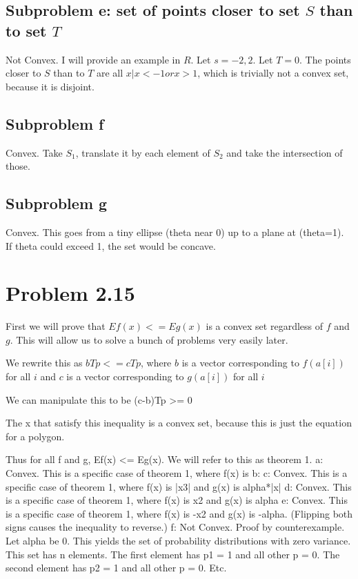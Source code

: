 \documentclass[a4paper]{article}
\begin{document}
\subsection{Subproblem e: set of points closer to set $S$ than to set $T$}
Not Convex. I will provide an example in $R$. Let $s = {-2, 2}$. Let $T = {0}$. The points closer to $S$ than to $T$ are all ${x | x < -1 or x > 1}$, which is trivially not a convex set, because it is disjoint.
\subsection{Subproblem f}
Convex. Take $S_1$, translate it by each element of $S_2$ and take the intersection of those.
\subsection{Subproblem g}
Convex. This goes from a tiny ellipse (theta near 0) up to a plane at (theta=1). If theta could exceed 1, the set would be concave.


\section{Problem 2.15}

First we will prove that $Ef(x) <= Eg(x)$ is a convex set regardless of $f$ and $g$. This will allow us to solve a bunch of problems very easily later.

We rewrite this as $bTp <= cTp$,
where $b$ is a vector corresponding to $f(a[i])$ for all $i$
and $c$ is a vector corresponding to $g(a[i])$ for all $i$

We can manipulate this to be (c-b)Tp >= 0

The x that satisfy this inequality is a convex set, because this is just the equation for a polygon.

Thus for all f and g, Ef(x) <= Eg(x). We will refer to this as theorem 1.
a:
Convex. This is a specific case of theorem 1, where f(x) is 
b:
c:
Convex. This is a specific case of theorem 1, where f(x) is |x3| and g(x) is alpha*|x|
d:
Convex. This is a specific case of theorem 1, where f(x) is x2 and g(x) is alpha
e:
Convex. This is a specific case of theorem 1, where f(x) is -x2 and g(x) is -alpha. (Flipping both signs causes the inequality to reverse.)
f:
Not Convex. Proof by counterexample. Let alpha be 0. This yields the set of probability distributions with zero variance. This set has n elements. The first element has p1 = 1 and all other p = 0. The second element has p2 = 1 and all other p = 0. Etc.
\end{document}

